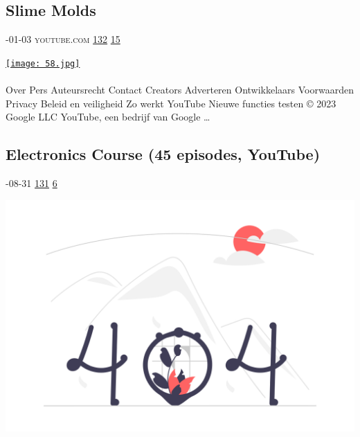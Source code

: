 \documentclass[10pt,a4paper]{article}
\begin{document}
\begin{multicols}{2}
\raggedcolumns
\noindent\begin{minipage}{\linewidth}
\medskip
\subsection{Slime Molds}
\textsc{\footnotesize
{\scriptsize\faCalendar}-01-03 
{\scriptsize\faYoutube}\space 
youtube.com 
{\scriptsize\faThumbsOUp}\space 
\href{http://news.ycombinator.com/item?id=37265664\&utm\_term=comment}{132} 
{\scriptsize\faComments}\space 
\href{http://news.ycombinator.com/item?id=37265664\&utm\_term=comment}{15} 
}
\par\medskip\noindent
\href{https://www.youtube.com/watch?v=gpt9cJrEZ\_Y\&utm\_source=hackernewsletter\&utm\_medium=email\&utm\_term=watching}{
    \texttt{[image: 58.jpg]}
}
\end{minipage}
\paragraph{}
Over
Pers
Auteursrecht
Contact
Creators
Adverteren
Ontwikkelaars
Voorwaarden
Privacy
Beleid en veiligheid
Zo werkt YouTube
Nieuwe functies testen
© 2023 Google LLC
YouTube, een bedrijf van Google
\dots\par
\noindent\begin{minipage}{\linewidth}
\medskip
\subsection{Electronics Course (45 episodes, YouTube)}
\textsc{\footnotesize
{\scriptsize\faCalendar}-08-31 
{\scriptsize\faThumbsOUp}\space 
\href{http://news.ycombinator.com/item?id=37339348\&utm\_term=comment}{131} 
{\scriptsize\faComments}\space 
\href{http://news.ycombinator.com/item?id=37339348\&utm\_term=comment}{6} 
}
\par\medskip\noindent
\href{https://www.youtube.com/playlist?list=PL7qUW0KPfsIIOPOKL84wK\_Qj9N7gvJX6v\&utm\_source=hackernewsletter\&utm\_medium=email\&utm\_term=watching}{
    \includegraphics[width=0.99\linewidth]{notfound.png}
}
\end{minipage}

\end{multicols}
\end{document}

